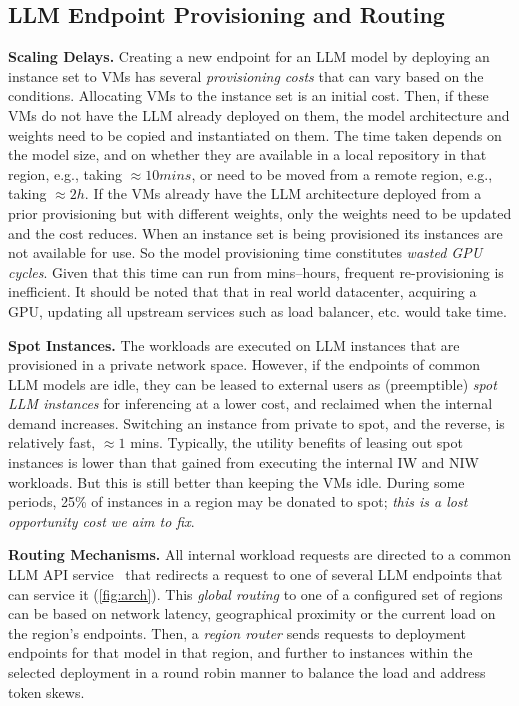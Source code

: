 \subsection{LLM Endpoint Provisioning and Routing}
\textbf{Scaling Delays. }Creating a new endpoint for an LLM model by deploying an instance set to VMs has several \textit{provisioning costs}
that can vary based on the conditions. 
Allocating VMs to the instance set is an initial cost. Then, if these VMs do not have the LLM already deployed on them, the model architecture and weights need to be copied and instantiated on them. The time taken depends on the model size, and on whether they are available in a local repository in that region, e.g., taking $\approx10mins$, or need to be moved from a remote region, e.g., taking $\approx 2h$.
If the VMs already have the LLM architecture deployed from a prior provisioning but with different weights, only the weights need to be updated and the cost reduces.
When an instance set is being provisioned 
its instances are not available for use. So the model provisioning time constitutes \textit{wasted GPU cycles}. Given that this time can run from mins--hours, frequent re-provisioning is inefficient. {It should be noted that  that in real world datacenter, acquiring a GPU, updating all upstream services such as load balancer, etc. would take time.} 

\textbf{Spot Instances. }The workloads are executed on LLM instances that are provisioned in a private network space.
However, if the endpoints of common LLM models are idle, they can be leased 
to external users as (preemptible) \textit{spot LLM instances} for inferencing at a lower cost, and reclaimed when the internal demand increases. Switching an instance from private to spot, and the reverse, is relatively fast, $\approx 1$ mins.
Typically, the utility benefits of leasing out spot instances is lower than that gained from executing the internal IW and NIW workloads. But this is still better than keeping the VMs idle. During some periods, 25\% of instances in a region may be donated to spot; \textit{this is a lost opportunity cost we aim to fix}.


\textbf{Routing Mechanisms. }All internal workload requests are directed to a common LLM API service~\cite{BatchAPI}
that redirects a request to one of several LLM endpoints that can service it (\autoref{fig:arch}). 
This \textit{global routing} to one of a configured set of regions 
can be based on network latency, geographical proximity or 
the current load on the region's endpoints. Then, a \textit{region router} sends requests to deployment endpoints for that model in that region, and further to instances within the selected deployment in a round robin manner to balance the load and address token skews.

